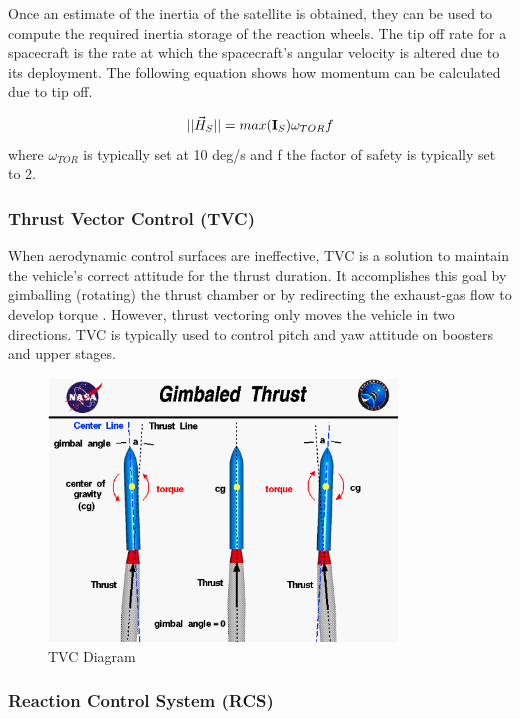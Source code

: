 \documentclass{article}
\begin{document}
Once an estimate of the inertia of the satellite is obtained, they can
be used to compute the required inertia storage of the reaction wheels. The 
tip off rate for a spacecraft is the rate at which the spacecraft’s
angular velocity is altered due to its deployment. The following
equation shows how momentum can be calculated due to tip off.

\begin{equation}
||\vec{H}_S|| = max({\bf I}_S)\omega_{TOR}f
\end{equation}
where $\omega_{TOR}$ is typically set at 10 deg/s and f the factor of
safety is typically set to 2.

\subsubsection{Thrust Vector Control (TVC)}

When aerodynamic control surfaces are ineffective, TVC is a solution
to maintain the vehicle's correct attitude for the thrust duration. It
accomplishes this goal by gimballing (rotating) the thrust chamber or
by redirecting the exhaust-gas flow to develop torque \cite{qp21}. However,
thrust vectoring only moves the vehicle in two directions. TVC is
typically used to control pitch and yaw attitude on boosters and upper
stages.
\begin{figure}[H]
  \begin{center}
  \includegraphics[height=70mm]{Figures/TVS}
  \end{center}
  \caption{TVC Diagram\cite{qp22}}
\end{figure}

\subsubsection{Reaction Control System (RCS)}
\end{document}
